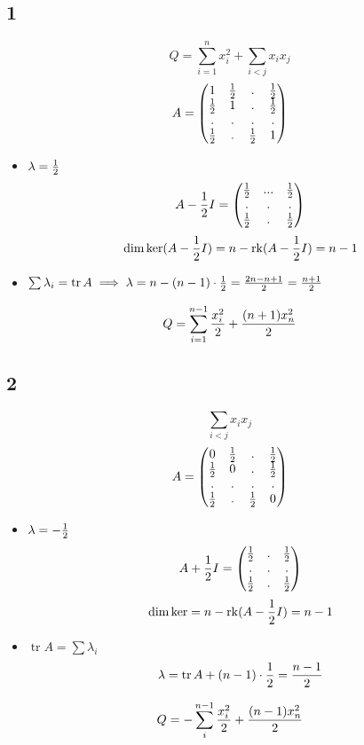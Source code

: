 \subsection{1}

$$ Q = \sum_{i = 1}^n x_i^2 + \sum_{i < j}x_ix_j $$
$$ A =
\begin{pmatrix}
	1 & \half & . & \half \\
    \half & 1 & . & \half \\
    . & . & . & . \\
    \half & . & \half & 1
\end{pmatrix} $$
\begin{itemize}
	\item $ \lambda = \half $
    $$ A - \half I =
    \begin{pmatrix}
    	\half & ... & \half \\
        . & . & . \\
        \half & . & \half
    \end{pmatrix} $$
    $$ \dim \ker(A - \half I) = n - \rk(A - \half I) = n - 1 $$
    \item $ \sum \lambda_i = \operatorname{tr}A \implies \lambda = n - (n - 1) \cdot \half = \half[2n - n + 1] = \half[n + 1] $
\end{itemize}
$$ Q = \sum_{i = 1}^{n - 1} \half[x_i^2] + \half[(n + 1)x_n^2] $$

\subsection{2}

$$ \sum_{i < j} x_ix_j $$
$$ A =
\begin{pmatrix}
	0 & \half & . & \half \\
    \half & 0 & . & \half \\
    . & . & . & . \\
    \half & . & \half & 0
\end{pmatrix} $$
\begin{itemize}
	\item $ \lambda = -\half $
    $$ A + \half I =
    \begin{pmatrix}
    	\half & . & \half \\
        . & . & . \\
        \half & . & \half
    \end{pmatrix} $$
    $$ \dim \ker = n - \rk(A - \half I) = n - 1 $$
    \item $ \operatorname{tr} A = \sum \lambda_i $
    $$ \lambda = \operatorname{tr} A + (n - 1) \cdot \half = \half[n - 1] $$
\end{itemize}
$$ Q = -\sum_i^{n - 1} \half[x_i^2] + \half[(n - 1)x_n^2] $$

